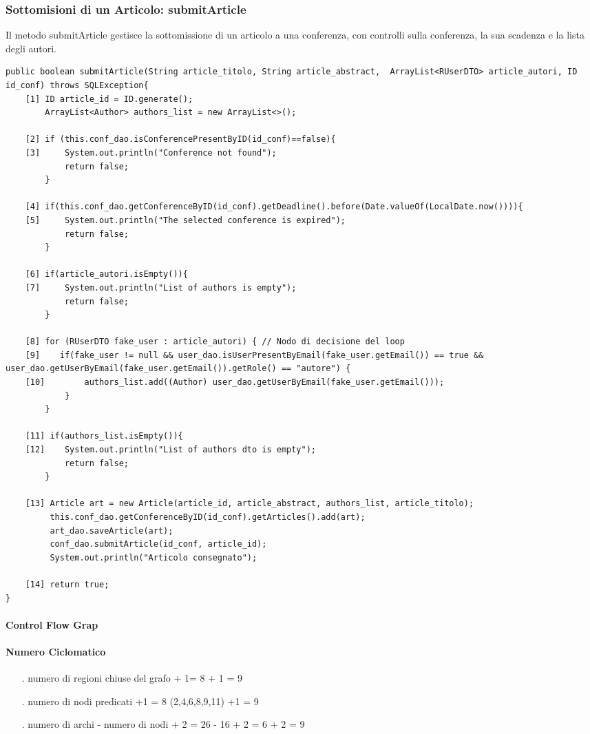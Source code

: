 \subsubsection{Sottomisioni di un Articolo: submitArticle}
Il metodo submitArticle gestisce la sottomissione di un articolo a una conferenza, con controlli sulla conferenza, la sua scadenza e la lista degli autori.
\begin{lstlisting}
public boolean submitArticle(String article_titolo, String article_abstract,  ArrayList<RUserDTO> article_autori, ID id_conf) throws SQLException{
    [1] ID article_id = ID.generate();
        ArrayList<Author> authors_list = new ArrayList<>();

    [2] if (this.conf_dao.isConferencePresentByID(id_conf)==false){
    [3]     System.out.println("Conference not found");
            return false;
        }

    [4] if(this.conf_dao.getConferenceByID(id_conf).getDeadline().before(Date.valueOf(LocalDate.now()))){
    [5]     System.out.println("The selected conference is expired");
            return false;
        }

    [6] if(article_autori.isEmpty()){
    [7]     System.out.println("List of authors is empty");
            return false;
        }

    [8] for (RUserDTO fake_user : article_autori) { // Nodo di decisione del loop
    [9]    if(fake_user != null && user_dao.isUserPresentByEmail(fake_user.getEmail()) == true && user_dao.getUserByEmail(fake_user.getEmail()).getRole() == "autore") {
    [10]        authors_list.add((Author) user_dao.getUserByEmail(fake_user.getEmail()));
            }
        }

    [11] if(authors_list.isEmpty()){
    [12]    System.out.println("List of authors dto is empty");
            return false;
        }

    [13] Article art = new Article(article_id, article_abstract, authors_list, article_titolo);
         this.conf_dao.getConferenceByID(id_conf).getArticles().add(art);
         art_dao.saveArticle(art);
         conf_dao.submitArticle(id_conf, article_id);
         System.out.println("Articolo consegnato");

    [14] return true;
}
\end{lstlisting} 
\paragraph{Control Flow Grap}
\paragraph{Numero Ciclomatico}
\begin{itemize}
\item[.] numero di regioni chiuse del grafo + 1= 8 + 1 = 9
\item[.] numero di nodi predicati +1 = 8 (2,4,6,8,9,11) +1 = 9
\item[.] numero di archi - numero di nodi + 2 = 26 - 16 + 2 = 6 + 2 = 9  
\end{itemize}
